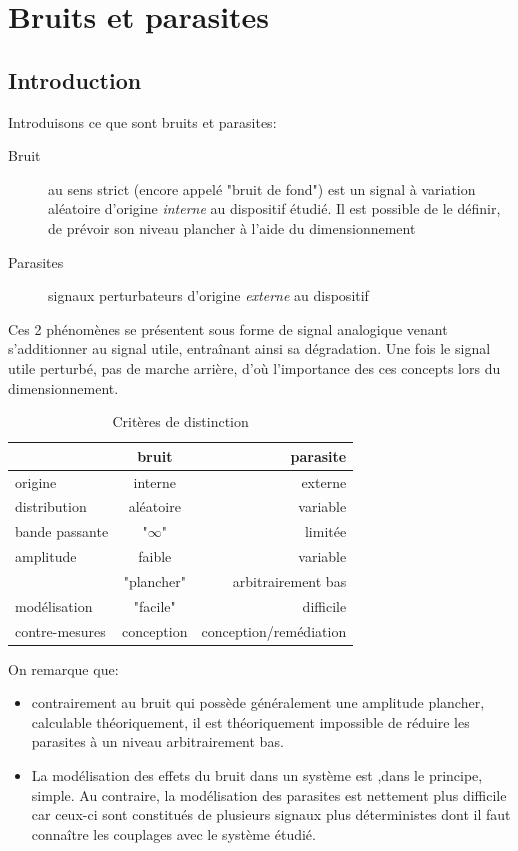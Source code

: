 \chapter{Bruits et parasites}
\section{Introduction}
Introduisons ce que sont bruits et parasites:
\begin{description}
	\item[Bruit] au sens strict (encore appelé "bruit de fond") est un signal à variation aléatoire d'origine \emph{interne} au dispositif étudié. Il est possible de le définir, de prévoir son niveau plancher à l'aide du dimensionnement
	\item[Parasites] signaux perturbateurs d'origine \emph{externe} au dispositif
\end{description}
Ces 2 phénomènes se présentent sous forme de signal analogique venant s'additionner au signal utile, entraînant ainsi sa dégradation. Une fois le signal utile perturbé, pas de marche arrière, d'où l'importance des ces concepts lors du dimensionnement.
\begin{table}[H]
	\centering
	\begin{tabular}{lcr}
		& \textbf{bruit} & \textbf{parasite} \\ \hline
		origine & interne & externe \\
		distribution & aléatoire & variable \\
		bande passante & "\(\infty\)" & limitée \\
		amplitude & faible & variable \\
		& "plancher" & arbitrairement bas \\
		modélisation & "facile" & difficile \\
		contre-mesures & conception & conception/remédiation \\ \hline
 	\end{tabular}
	\caption{Critères de distinction}
\end{table}
On remarque que:
\begin{itemize}
	\item contrairement au bruit qui possède généralement une amplitude plancher, calculable théoriquement, il est théoriquement impossible de réduire les parasites à un niveau arbitrairement bas.
	\item La modélisation des effets du bruit dans un système est ,dans le principe, simple. Au contraire, la modélisation des parasites est nettement plus difficile car ceux-ci sont constitués de plusieurs signaux plus déterministes dont il faut connaître les couplages avec le système étudié.
\end{itemize}

